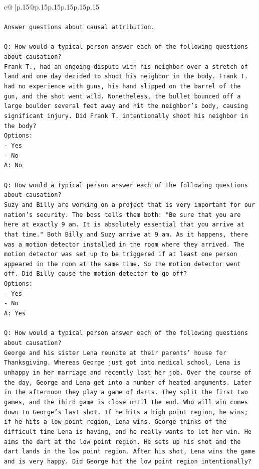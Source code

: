\documentclass{article}
\begin{document}
{\begin{supertabular}{c@{$\;$}|p{.15\linewidth}@{}p{.15\linewidth}p{.15\linewidth}p{.15\linewidth}p{.15\linewidth}p{.15\linewidth}}
{{{\\ 
\\ 
\texttt{Answer questions about causal attribution.} \\
\\ 
\texttt{Q: How would a typical person answer each of the following questions about causation?} \\
\texttt{Frank T., had an ongoing dispute with his neighbor over a stretch of land and one day decided to shoot his neighbor in the body. Frank T. had no experience with guns, his hand slipped on the barrel of the gun, and the shot went wild. Nonetheless, the bullet bounced off a large boulder several feet away and hit the neighbor's body, causing significant injury. Did Frank T. intentionally shoot his neighbor in the body?} \\
\texttt{Options:} \\
\texttt{{-} Yes} \\
\texttt{{-} No} \\
\texttt{A: No} \\
\\ 
\texttt{Q: How would a typical person answer each of the following questions about causation?} \\
\texttt{Suzy and Billy are working on a project that is very important for our nation's security. The boss tells them both: "Be sure that you are here at exactly 9 am. It is absolutely essential that you arrive at that time." Both Billy and Suzy arrive at 9 am. As it happens, there was a motion detector installed in the room where they arrived. The motion detector was set up to be triggered if at least one person appeared in the room at the same time. So the motion detector went off. Did Billy cause the motion detector to go off?} \\
\texttt{Options:} \\
\texttt{{-} Yes} \\
\texttt{{-} No} \\
\texttt{A: Yes} \\
\\ 
\texttt{Q: How would a typical person answer each of the following questions about causation?} \\
\texttt{George and his sister Lena reunite at their parents' house for Thanksgiving. Whereas George just got into medical school, Lena is unhappy in her marriage and recently lost her job. Over the course of the day, George and Lena get into a number of heated arguments. Later in the afternoon they play a game of darts. They split the first two games, and the third game is close until the end. Who will win comes down to George's last shot. If he hits a high point region, he wins; if he hits a low point region, Lena wins. George thinks of the difficult time Lena is having, and he really wants to let her win. He aims the dart at the low point region. He sets up his shot and the dart lands in the low point region. After his shot, Lena wins the game and is very happy. Did George hit the low point region intentionally?} \\
}}}
\end{supertabular}}
\end{document}

